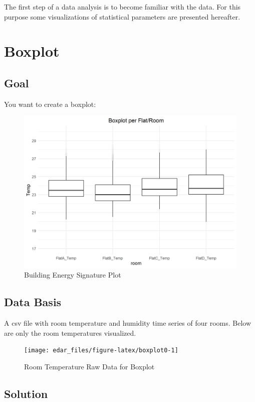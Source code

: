 \documentclass[
  a4paperpaper,
]{book}
\begin{document}
The first step of a data analysis is to become familiar with the data. For this purpose some visualizations of statistical parameters are presented hereafter.

\newpage

\hypertarget{boxplot}{%
\section{Boxplot}\label{boxplot}}

\hypertarget{goal}{%
\subsection{Goal}\label{goal}}

You want to create a boxplot:

\begin{figure}
\includegraphics[width=0.7\linewidth]{images/boxplot} \caption{Building Energy Signature Plot}\label{fig:unnamed-chunk-9}
\end{figure}

\hypertarget{data-basis}{%
\subsection{Data Basis}\label{data-basis}}

A csv file with room temperature and humidity time series of four rooms. Below are only the room temperatures visualized.

\begin{figure}
\texttt{[image: edar\_files/figure-latex/boxplot0-1]} \caption{Room Temperature Raw Data for Boxplot}\label{fig:boxplot0}
\end{figure}

\newpage

\hypertarget{solution}{%
\subsection{Solution}\label{solution}}
\end{document}
